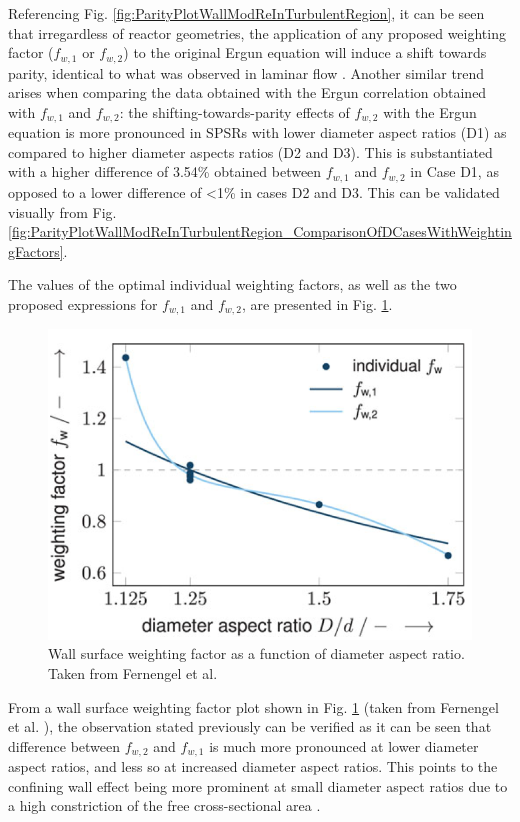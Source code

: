 Referencing Fig. \ref{fig:ParityPlotWallModReInTurbulentRegion}, it can be seen that irregardless of reactor geometries, the application of any proposed weighting factor ($f_{w,1}$ or $f_{w,2}$) to the original Ergun equation will induce a shift towards parity, identical to what was observed in laminar flow \cite{Fernengel2020}.
Another similar trend arises when comparing the data obtained with the Ergun correlation obtained with $f_{w,1}$ and $f_{w,2}$: the shifting-towards-parity effects of $f_{w,2}$ with the Ergun equation is more pronounced in SPSRs with lower diameter aspect ratios (D1) as compared to higher diameter aspects ratios (D2 and D3). This is substantiated with a higher difference of 3.54\% obtained between $f_{w,1}$ and $f_{w,2}$ in Case D1, as opposed to a lower difference of <1\% in cases D2 and D3. This can be validated visually from Fig. \ref{fig:ParityPlotWallModReInTurbulentRegion_ComparisonOfDCasesWithWeightingFactors}.

The values of the optimal individual weighting factors, as well as the two proposed expressions for $f_{w,1}$ and $f_{w,2}$, are presented in Fig. \ref{fig:JohannaweightingFactorDiagram}.
\begin{figure} [H]
		\centering
	\includegraphics[width=0.5\linewidth]{Figures/visualisation/JohannaweightingFactorDiagram.PNG}
	\caption[Wall surface weighting factor as a function of diameter aspect ratio.]{Wall surface weighting factor as a function of diameter aspect ratio. Taken from Fernengel et al. \cite{Fernengel2020}}
	\label{fig:JohannaweightingFactorDiagram}
\end{figure}
From a wall surface weighting factor plot shown in Fig. \ref{fig:JohannaweightingFactorDiagram} (taken from Fernengel et al. \cite{Fernengel2020}), the observation stated previously can be verified as it can be seen that difference between $f_{w,2}$ and $f_{w,1}$ is much more pronounced at lower diameter aspect ratios, and less so at increased diameter aspect ratios. This points to the confining wall effect being more prominent at small diameter aspect ratios due to a high constriction of the free cross-sectional area \cite{Fernengel2020}.

